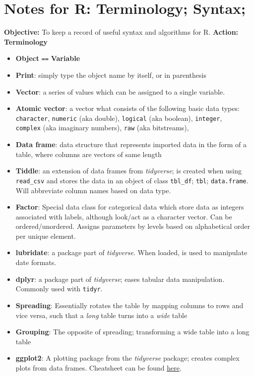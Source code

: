 \documentclass{article}
\begin{document}
\section{Notes for R: Terminology; Syntax;}
\textbf{Objective:} To keep a record of useful syntax and algorithms for R.
\textbf{Action:}\\
\textbf{Terminology}
\begin{itemize}
    \item \textbf{Object} \verb|==| \textbf{Variable}
    \item \textbf{Print}: simply type the object name by itself, or in parenthesis
    \item \textbf{Vector}: a series of values which can be assigned to a single variable.
    \item \textbf{Atomic vector}: a vector what consists of the following basic data types: \texttt{character}, \texttt{numeric} (aka double), \texttt{logical} (aka boolean), \texttt{integer},\\ \texttt{complex} (aka imaginary numbers), \texttt{raw} (aka bitstreams),
    \item \textbf{Data frame}: data structure that represents imported data in the form of a table, where columns are vectors of same length
    \item \textbf{Tiddle}: an extension of data frames from \textit{tidyverse}; is created when using \verb|read_csv| and stores the data in an object of class \verb|tbl_df|; \verb|tbl|; \verb|data.frame|. Will abbreviate column names based on data type.
    \item \textbf{Factor}: Special data class for categorical data which store data as integers associated with labels, although look/act as a character vector. Can be ordered/unordered. Assigns parameters by levels based on alphabetical order per unique element.
    \item \textbf{lubridate}: a package part of \textit{tidyverse}. When loaded, is used to manipulate date formats.
    \item \textbf{dplyr}: a package part of \textit{tidyverse}; eases tabular data manipulation. Commonly used with \verb|tidyr|. 
    \item \textbf{Spreading}: Essentially rotates the table by mapping columns to rows and vice versa, such that a \textit{long} table turns into a \textit{wide} table
    \item \textbf{Grouping}: The opposite of spreading; transforming a wide table into a long table
    \item \textbf{ggplot2}: A plotting package from the \textit{tidyverse} package; creates complex plots from data frames. Cheatsheet can be found \hyperlink{https://rstudio.com/wp-content/uploads/2016/11/ggplot2-cheatsheet-2.1.pdf}{here}.
\end{itemize}
\end{document}
